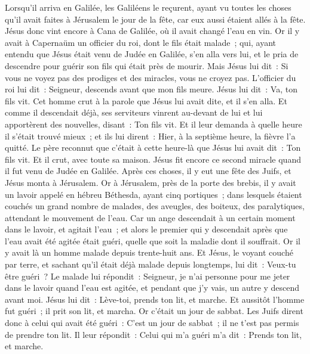 \begin{multicols}{2}
Lorsqu'il arriva en Galilée, les Galiléens le reçurent, ayant vu toutes les choses qu'il avait faites à Jérusalem le jour de la fête, car eux aussi étaient allés à la fête.
Jésus donc vint encore à Cana de Galilée, où il avait changé l'eau en vin. Or il y avait à Capernaüm un officier du roi, dont le fils était malade~;
qui, ayant entendu que Jésus était venu de Judée en Galilée, s'en alla vers lui, et le pria de descendre pour guérir son fils qui était près de mourir.
Mais Jésus lui dit~: Si vous ne voyez pas des prodiges et des miracles, vous ne croyez pas.
L'officier du roi lui dit~: Seigneur, descends avant que mon fils meure.
Jésus lui dit~: Va, ton fils vit. Cet homme crut à la parole que Jésus lui avait dite, et il s'en alla.
Et comme il descendait déjà, ses serviteurs vinrent au-devant de lui et lui apportèrent des nouvelles, disant~: Ton fils vit.
Et il leur demanda à quelle heure il s'était trouvé mieux~; et ils lui dirent~: Hier, à la septième heure, la fièvre l'a quitté.
Le père reconnut que c'était à cette heure-là que Jésus lui avait dit~: Ton fils vit. Et il crut, avec toute sa maison.
Jésus fit encore ce second miracle quand il fut venu de Judée en Galilée.
\VerseOne{}Après ces choses, il y eut une fête des Juifs, et Jésus monta à Jérusalem.
Or à Jérusalem, près de la porte des brebis, il y avait un lavoir appelé en hébreu Béthesda, ayant cinq portiques~;
dans lesquels étaient couchés un grand nombre de malades, des aveugles, des boiteux, des paralytiques, attendant le mouvement de l'eau.
Car un ange descendait à un certain moment dans le lavoir, et agitait l'eau~; et alors le premier qui y descendait après que l'eau avait été agitée était guéri, quelle que soit la maladie dont il souffrait.
Or il y avait là un homme malade depuis trente-huit ans.
Et Jésus, le voyant couché par terre, et sachant qu'il était déjà malade depuis longtemps, lui dit~: Veux-tu être guéri~?
Le malade lui répondit~: Seigneur, je n'ai personne pour me jeter dans le lavoir quand l'eau est agitée, et pendant que j'y vais, un autre y descend avant moi.
Jésus lui dit~: Lève-toi, prends ton lit, et marche.
Et aussitôt l'homme fut guéri~; il prit son lit, et marcha. Or c'était un jour de sabbat.
Les Juifs dirent donc à celui qui avait été guéri~: C'est un jour de sabbat~; il ne t'est pas permis de prendre ton lit.
Il leur répondit~: Celui qui m'a guéri m'a dit~: Prends ton lit, et marche.

\end{multicols}
